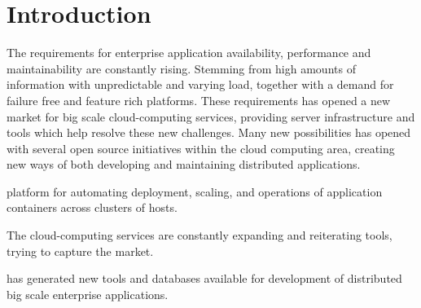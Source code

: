\chapter{Introduction}
\label{ch:introduction}
The requirements for enterprise application availability, performance and maintainability are constantly rising. Stemming from high amounts of information with unpredictable and varying load, together with a demand for failure free and feature rich platforms. These requirements has opened a new market for big scale cloud-computing services, providing server infrastructure and tools which help resolve these new challenges. Many new possibilities has opened with several open source initiatives within the cloud computing area, creating new ways of both developing and maintaining distributed applications.






platform for automating deployment, scaling, and operations of application containers across clusters of hosts.

The cloud-computing services are constantly expanding and reiterating tools, trying to capture the market.

has generated new tools and databases available for development of distributed big scale enterprise applications.